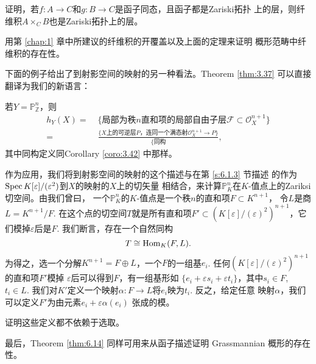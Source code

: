 \begin{exe}\label{exe:6.15}
\begin{compactenum}[(a)]
\item 证明，若$f:A\to C$和$g:B\to C$是函子同态，且函子都是Zariski拓扑
    上的层，则纤维积$A\times_C B$也是Zariski拓扑上的层。
\item 用第 \ref{chap:1} 章中所建议的纤维积的开覆盖以及上面的定理来证明
    概形范畴中纤维积的存在性。
\end{compactenum}
\end{exe}

下面的例子给出了到射影空间的映射的另一种看法。Theorem \ref{thm:3.37}
可以直接翻译为我们的新语言：

\begin{thm}\label{thm:6.16}
若$Y=\mathbb P_{\mathbb Z}^n$，则
\begin{align*}
h_Y(X)=&
\;\{\text{局部为秩$n$直和项的局部自由子层$\mathscr F\subset 
\mathscr O_X^{n+1}$}\}\\
=&\; \frac{\{\text{$X$上的可逆层$P$，连同一个满态射$\mathscr O_X^{n+1}
\to P$}\}}{\{\text{同构}},
\end{align*}
其中同构定义同Corollary \ref{coro:3.42} 中那样。
\end{thm}

作为应用，我们将到射影空间的映射的这个描述与在第 \ref{s:6.1.3} 节描述
的作为$\operatorname{Spec} K[\varepsilon]/(\varepsilon^2)$到$X$的映射的$X$上的切矢量
相结合，来计算$\mathbb P_K^n$在$K$-值点上的Zariksi切空间。由我们曾曰，
一个$\mathbb P_K^n$的$K$-值点是一个秩$n$的直和项$F\subset K^{n+1}$，
令$L$是商$L=K^{n+1}/F$. 在这个点的切空间$T$就是所有直和项$F'\subset 
(K[\varepsilon]/(\varepsilon)^2)^{n+1}$，它们模掉$\varepsilon$后是$F$.
我们断言，存在一个自然同构
\[
T\cong \operatorname{Hom}_K(F,L).   
\]
为得之，选一个分解$K^{n+1}=F\oplus L$，一个$F$的一组基$e_i$. 
任何$(K[\varepsilon]/(\varepsilon)^2)^{n+1}$的直和项$F'$模掉
$\varepsilon$后可以得到$F$，有一组基形如
$\{e_i+\varepsilon s_i+\varepsilon t_i\}$，其中$s_i\in F$, $t_i\in L$.
我们对$K'$定义一个映射$\alpha:F\to L$将$e_i$映为$t_i$. 反之，给定任意
映射$\alpha$，我们可以定义$F'$为由元素$e_i+\varepsilon\alpha(e_i)$
张成的模。

\begin{exe}\label{exe:6.17}
证明这些定义都不依赖于选取。
\end{exe}

最后，Theorem \ref{thm:6.14} 同样可用来从函子描述证明 Grassmannian
概形的存在性。

